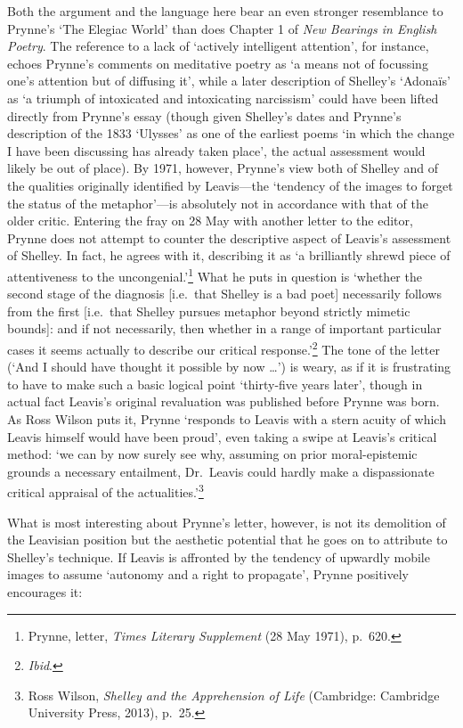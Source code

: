 \documentclass[]{article}
\begin{document}
\noindent Both the argument and the language here bear an even stronger
resemblance to Prynne’s ‘The Elegiac World’ than does Chapter 1 of
\emph{New Bearings in English Poetry}. The reference to a lack of
‘actively intelligent attention’, for instance, echoes Prynne’s comments
on meditative poetry as ‘a means not of focussing one’s attention but of
diffusing it’, while a later description of Shelley’s ‘Adonaïs’ as ‘a
triumph of intoxicated and intoxicating narcissism’ could have been
lifted directly from Prynne’s essay (though given Shelley’s dates and
Prynne’s description of the 1833 ‘Ulysses’ as one of the earliest poems
‘in which the change I have been discussing has already taken place’,
the actual assessment would likely be out of place). By 1971, however,
Prynne’s view both of Shelley and of the qualities originally identified
by Leavis—the ‘tendency of the images to forget the status of the
metaphor’—is absolutely not in accordance with that of the older critic.
Entering the fray on 28 May with another letter to the editor, Prynne
does not attempt to counter the descriptive aspect of Leavis’s
assessment of Shelley. In fact, he agrees with it, describing it as ‘a
brilliantly shrewd piece of attentiveness to the uncongenial.’\footnote{Prynne,
  letter, \emph{Times Literary Supplement} (28 May 1971), p.~620.} What
he puts in question is ‘whether the second stage of the diagnosis
{[}i.e.~that Shelley is a bad poet{]} necessarily follows from the first
{[}i.e.~that Shelley pursues metaphor beyond strictly mimetic bounds{]}:
and if not necessarily, then whether in a range of important particular
cases it seems actually to describe our critical response.’\footnote{\emph{Ibid}.}
The tone of the letter (‘And I should have thought it possible by now
\ldots{}’) is weary, as if it is frustrating to have to make such a
basic logical point ‘thirty-five years later’, though in actual fact
Leavis’s original revaluation was published before Prynne was born. As
Ross Wilson puts it, Prynne ‘responds to Leavis with a stern acuity of
which Leavis himself would have been proud’, even taking a swipe at
Leavis’s critical method: ‘we can by now surely see why, assuming on
prior moral-epistemic grounds a necessary entailment, Dr.~Leavis could
hardly make a dispassionate critical appraisal of the
actualities.’\footnote{Ross Wilson, \emph{Shelley and the Apprehension
  of Life} (Cambridge: Cambridge University Press, 2013), p.~25.}

What is most interesting about Prynne’s letter, however, is not its
demolition of the Leavisian position but the aesthetic potential that he
goes on to attribute to Shelley’s technique. If Leavis is affronted by
the tendency of upwardly mobile images to assume ‘autonomy and a right
to propagate’, Prynne positively encourages it:
\end{document}
